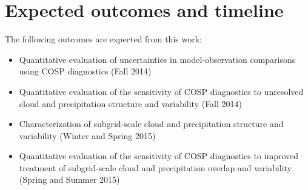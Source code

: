 \documentclass[letter]{article}
\begin{document}

\section{Expected outcomes and timeline}
The following outcomes are expected from this work:
\begin{itemize}
    \item Quantitative evaluation of uncertainties in model-observation comparisons using COSP diagnostics (Fall 2014)
    \item Quantitative evaluation of the sensitivity of COSP diagnostics to unresolved cloud and precipitation structure and variability (Fall 2014)
    \item Characterization of subgrid-scale cloud and precipitation structure and variability (Winter and Spring 2015)
    \item Quantitative evaluation of the sensitivity of COSP diagnostics to improved treatment of subgrid-scale cloud and precipitation overlap and variability (Spring and Summer 2015)
\end{itemize}
\end{document}
